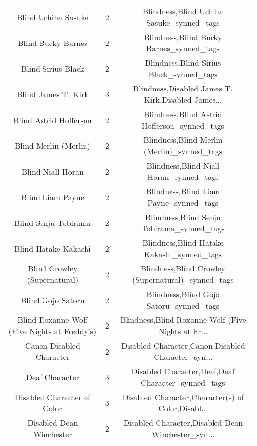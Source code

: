 \begin{table}[h!]
{\begin{tabular}{|c|c|c|}
                               Blind Uchiha Sasuke &          2 &          Blindness,Blind Uchiha Sasuke\_synned\_tags \\
                                Blind Bucky Barnes &          2 &           Blindness,Blind Bucky Barnes\_synned\_tags \\
                                Blind Sirius Black &          2 &           Blindness,Blind Sirius Black\_synned\_tags \\
                               Blind James T. Kirk &          3 & Blindness,Disabled James T. Kirk,Disabled James... \\
                            Blind Astrid Hofferson &          2 &       Blindness,Blind Astrid Hofferson\_synned\_tags \\
                             Blind Merlin (Merlin) &          2 &        Blindness,Blind Merlin (Merlin)\_synned\_tags \\
                                 Blind Niall Horan &          2 &            Blindness,Blind Niall Horan\_synned\_tags \\
                                  Blind Liam Payne &          2 &             Blindness,Blind Liam Payne\_synned\_tags \\
                              Blind Senju Tobirama &          2 &         Blindness,Blind Senju Tobirama\_synned\_tags \\
                              Blind Hatake Kakashi &          2 &         Blindness,Blind Hatake Kakashi\_synned\_tags \\
                      Blind Crowley (Supernatural) &          2 & Blindness,Blind Crowley (Supernatural)\_synned\_tags \\
                                 Blind Gojo Satoru &          2 &            Blindness,Blind Gojo Satoru\_synned\_tags \\
      Blind Roxanne Wolf (Five Nights at Freddy's) &          2 & Blindness,Blind Roxanne Wolf (Five Nights at Fr... \\
                          Canon Disabled Character &          2 & Disabled Character,Canon Disabled Character\_syn... \\
                                    Deaf Character &          3 & Disabled Character,Deaf,Deaf Character\_synned\_tags \\
                       Disabled Character of Color &          3 & Disabled Character,Character(s) of Color,Disabl... \\
                          Disabled Dean Winchester &          2 & Disabled Character,Disabled Dean Winchester\_syn... \\

\end{tabular}}
\end{table}
